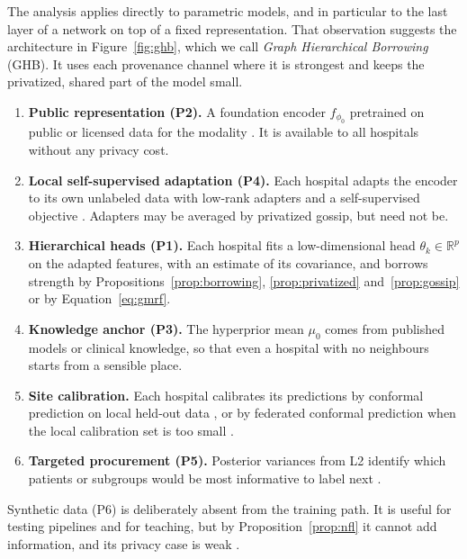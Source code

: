 \documentclass[acmsmall,screen,review]{acmart}
\theoremstyle{acmdefinition}
\begin{document}
The analysis applies directly to parametric models, and in particular to the last layer of a network on top of a fixed representation. That observation suggests the architecture in Figure~\ref{fig:ghb}, which we call \emph{Graph Hierarchical Borrowing} (GHB). It uses each provenance channel where it is strongest and keeps the privatized, shared part of the model small.
\begin{enumerate}[label=\textbf{L\arabic*},start=0,leftmargin=*]
\item \textbf{Public representation (P2).} A foundation encoder $f_{\phi_0}$ pretrained on public or licensed data for the modality \cite{moor2023foundation,rasmy2021med,zhou2023foundation}. It is available to all hospitals without any privacy cost.
\item \textbf{Local self-supervised adaptation (P4).} Each hospital adapts the encoder to its own unlabeled data with low-rank adapters \cite{hu2022lora} and a self-supervised objective \cite{chen2020simple,he2022masked}. Adapters may be averaged by privatized gossip, but need not be.
\item \textbf{Hierarchical heads (P1).} Each hospital fits a low-dimensional head $\theta_k\in\mathbb{R}^p$ on the adapted features, with an estimate of its covariance, and borrows strength by Propositions~\ref{prop:borrowing}, \ref{prop:privatized} and~\ref{prop:gossip} or by Equation~\eqref{eq:gmrf}.
\item \textbf{Knowledge anchor (P3).} The hyperprior mean $\mu_0$ comes from published models or clinical knowledge, so that even a hospital with no neighbours starts from a sensible place.
\item \textbf{Site calibration.} Each hospital calibrates its predictions by conformal prediction on local held-out data \cite{angelopoulos2023conformal,shafer2008tutorial}, or by federated conformal prediction when the local calibration set is too small \cite{lu2023federated}.
\item \textbf{Targeted procurement (P5).} Posterior variances from L2 identify which patients or subgroups would be most informative to label next \cite{settles2009active}.
\end{enumerate}

Synthetic data (P6) is deliberately absent from the training path. It is useful for testing pipelines and for teaching, but by Proposition~\ref{prop:nfl} it cannot add information, and its privacy case is weak \cite{stadler2022synthetic}.
\end{document}
